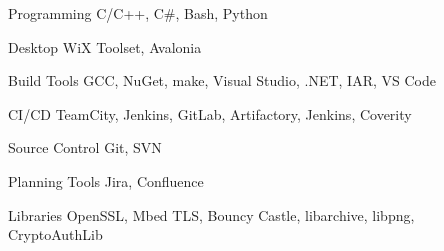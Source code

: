 

\begin{cvskills}


\cvskill
{Programming} %
{C/C++, C\#, Bash, Python} %


\cvskill
{Desktop} %
{WiX Toolset, Avalonia} %


\cvskill
{Build Tools} %
{GCC, NuGet, make, Visual Studio, .NET, IAR, VS Code} %


\cvskill
{CI/CD} %
{TeamCity, Jenkins, GitLab, Artifactory, Jenkins, Coverity} %


\cvskill
{Source Control} %
{Git, SVN} %


\cvskill
{Planning Tools} %
{Jira, Confluence} %


\cvskill
{Libraries} %
{OpenSSL, Mbed TLS, Bouncy Castle, libarchive, libpng, CryptoAuthLib} %

\end{cvskills}